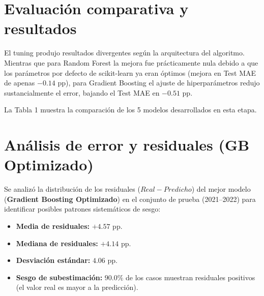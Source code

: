 \documentclass[12pt,a4paper]{article}
\begin{document}
\section{Evaluación comparativa y resultados}

El tuning produjo resultados divergentes según la arquitectura del algoritmo. Mientras que para Random Forest la mejora fue prácticamente nula debido a que los parámetros por defecto de scikit-learn ya eran óptimos (mejora en Test MAE de apenas $-0.14$ pp), para Gradient Boosting el ajuste de hiperparámetros redujo sustancialmente el error, bajando el Test MAE en $-0.51$ pp.

La Tabla 1 muestra la comparación de los 5 modelos desarrollados en esta etapa.

\begin{table}[h!]
\centering
\caption{Tabla comparativa final de modelos (CV vs Test)}
\vspace{0.5em}
\end{table}

\section{Análisis de error y residuales (GB Optimizado)}

Se analizó la distribución de los residuales ($Real - Predicho$) del mejor modelo (\textbf{Gradient Boosting Optimizado}) en el conjunto de prueba (2021--2022) para identificar posibles patrones sistemáticos de sesgo:
\begin{itemize}
    \item \textbf{Media de residuales:} $+4.57$ pp.
    \item \textbf{Mediana de residuales:} $+4.14$ pp.
    \item \textbf{Desviación estándar:} $4.06$ pp.
    \item \textbf{Sesgo de subestimación:} $90.0\%$ de los casos muestran residuales positivos (el valor real es mayor a la predicción).
\end{itemize}
\end{document}
